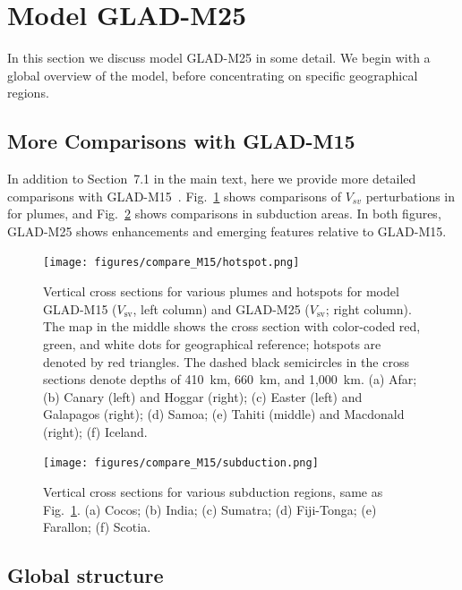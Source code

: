 \documentclass[extra,mreferee]{gji}
\begin{document}
\section{Model GLAD-M25}
\label{section:model}

In this section we discuss model GLAD-M25 in some detail.
We begin with a global overview of the model, before concentrating on
specific geographical regions.

\subsection{More Comparisons with GLAD-M15}

In addition to Section~7.1 in the main text, here we provide more detailed comparisons with GLAD-M15~\citep{bozdaug2016global}. Fig.~\ref{fig:m15_hotspot} shows comparisons of $V_{sv}$ perturbations in for plumes, and Fig.~\ref{fig:m15_subduction} shows comparisons in subduction areas. In both figures, GLAD-M25 shows enhancements and emerging features relative to GLAD-M15.

\begin{figure}
  \centering
  \texttt{[image: figures/compare\_M15/hotspot.png]}
  \caption{\small{Vertical cross sections for various plumes and hotspots for model GLAD-M15 ($V_\textrm{sv}$, left column) and GLAD-M25 ($V_\textrm{sv}$; right column).
  The map in the middle shows the cross section with color-coded red, green, and white dots for geographical reference; hotspots are denoted by red triangles.
  The dashed black semicircles in the cross sections denote depths of 410~km, 660~km, and 1,000~km.
  (a) Afar; (b) Canary (left) and Hoggar (right); (c) Easter (left) and Galapagos (right); (d) Samoa; (e) Tahiti (middle) and Macdonald (right); (f) Iceland.
  }}
  \label{fig:m15_hotspot}
\end{figure}

\begin{figure}
  \centering
  \texttt{[image: figures/compare\_M15/subduction.png]}
  \caption{\small{ Vertical cross sections for various subduction regions, same as Fig.~\ref{fig:m15_hotspot}.
  (a) Cocos; (b) India; (c) Sumatra; (d) Fiji-Tonga; (e) Farallon; (f) Scotia. }}
  \label{fig:m15_subduction}
\end{figure}

\subsection{Global structure}
\end{document}
